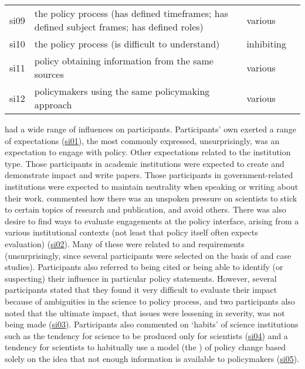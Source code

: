 \begin{table}[!ht]
\begin{tabular}{L{.07\linewidth}L{.3\linewidth}L{.11\linewidth}L{.52\linewidth}}
si09 & the policy process (has defined timeframes; has defined subject frames; has defined roles) & various &  \\
si10 & the policy process (is difficult to understand) & inhibiting &  \\
si11 & policy obtaining information from the same sources & various &  \\
si12 & policymakers using the same policymaking approach & various &  \\
\hline
\end{tabular}
\end{table}

\skiinst{} had a wide range of influences on participants. Participants' own \skiinst{} exerted a range of expectations (\hyperref[tab:resskiinst]{si01}), the most commonly expressed, unsurprisingly, was an expectation to engage with policy. Other expectations related to the institution type. Those participants in academic institutions were expected to create and demonstrate impact and write papers. Those participants in government-related institutions were expected to maintain neutrality when speaking or writing about their work.  commented how there was an unspoken pressure on scientists to stick to certain topics of research and publication, and avoid others. There was also desire to find ways to evaluate engagements at the policy interface, arising from a various institutional contexts (not least that policy itself often expects evaluation) (\hyperref[tab:resskiinst]{si02}). Many of these were related to \REF{} and \UKRI{} requirements (unsurprisingly, since several participants were selected on the basis of \REF{} and \UKRI{} case studies). Participants also referred to being cited or being able to identify (or suspecting) their influence in particular policy statements. However, several participants stated that they found it very difficult to evaluate their impact because of ambiguities in the science to policy process, and two participants also noted that the ultimate impact, that \CAN{} issues were lessening in severity, was not being made (\hyperref[tab:resskiinst]{si03}). Participants also commented on `habits' of science institutions such as the tendency for science to be produced only for scientists (\hyperref[tab:resskiinst]{si04}) and a tendency for scientists to habitually use a model (the \IDM) of policy change based solely on the idea that not enough information is available to policymakers (\hyperref[tab:resskiinst]{si05}). 

